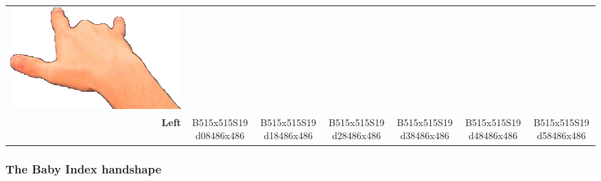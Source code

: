 \documentclass{article}
\begin{document}
\begin{center}
\begin{tabular}{r*{6}{c}}
\includegraphics[scale=0.1]{images/06-10-6.jpg}\\
\textbf{Left}&
B515x515S19d08486x486&
B515x515S19d18486x486&
B515x515S19d28486x486&
B515x515S19d38486x486&
B515x515S19d48486x486&
B515x515S19d58486x486\\
\end{tabular}
\end{center}

\subsubsection{The Baby Index handshape}
\end{document}
